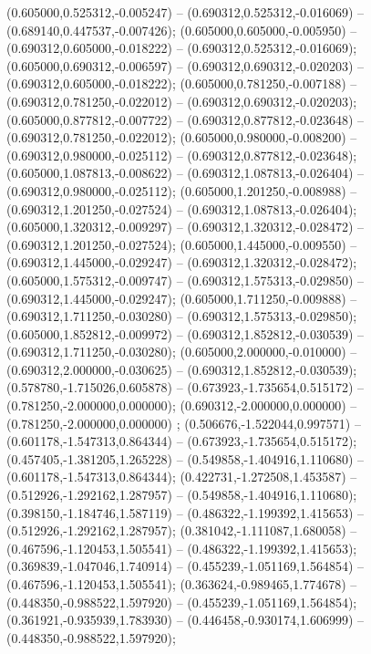  (0.605000,0.525312,-0.005247) -- (0.690312,0.525312,-0.016069) -- (0.689140,0.447537,-0.007426);
 (0.605000,0.605000,-0.005950) -- (0.690312,0.605000,-0.018222) -- (0.690312,0.525312,-0.016069);
 (0.605000,0.690312,-0.006597) -- (0.690312,0.690312,-0.020203) -- (0.690312,0.605000,-0.018222);
 (0.605000,0.781250,-0.007188) -- (0.690312,0.781250,-0.022012) -- (0.690312,0.690312,-0.020203);
 (0.605000,0.877812,-0.007722) -- (0.690312,0.877812,-0.023648) -- (0.690312,0.781250,-0.022012);
 (0.605000,0.980000,-0.008200) -- (0.690312,0.980000,-0.025112) -- (0.690312,0.877812,-0.023648);
 (0.605000,1.087813,-0.008622) -- (0.690312,1.087813,-0.026404) -- (0.690312,0.980000,-0.025112);
 (0.605000,1.201250,-0.008988) -- (0.690312,1.201250,-0.027524) -- (0.690312,1.087813,-0.026404);
 (0.605000,1.320312,-0.009297) -- (0.690312,1.320312,-0.028472) -- (0.690312,1.201250,-0.027524);
 (0.605000,1.445000,-0.009550) -- (0.690312,1.445000,-0.029247) -- (0.690312,1.320312,-0.028472);
 (0.605000,1.575312,-0.009747) -- (0.690312,1.575313,-0.029850) -- (0.690312,1.445000,-0.029247);
 (0.605000,1.711250,-0.009888) -- (0.690312,1.711250,-0.030280) -- (0.690312,1.575313,-0.029850);
 (0.605000,1.852812,-0.009972) -- (0.690312,1.852812,-0.030539) -- (0.690312,1.711250,-0.030280);
 (0.605000,2.000000,-0.010000) -- (0.690312,2.000000,-0.030625) -- (0.690312,1.852812,-0.030539);
 (0.578780,-1.715026,0.605878) -- (0.673923,-1.735654,0.515172) -- (0.781250,-2.000000,0.000000);
 (0.690312,-2.000000,0.000000) -- (0.781250,-2.000000,0.000000) ;
 (0.506676,-1.522044,0.997571) -- (0.601178,-1.547313,0.864344) -- (0.673923,-1.735654,0.515172);
 (0.457405,-1.381205,1.265228) -- (0.549858,-1.404916,1.110680) -- (0.601178,-1.547313,0.864344);
 (0.422731,-1.272508,1.453587) -- (0.512926,-1.292162,1.287957) -- (0.549858,-1.404916,1.110680);
 (0.398150,-1.184746,1.587119) -- (0.486322,-1.199392,1.415653) -- (0.512926,-1.292162,1.287957);
 (0.381042,-1.111087,1.680058) -- (0.467596,-1.120453,1.505541) -- (0.486322,-1.199392,1.415653);
 (0.369839,-1.047046,1.740914) -- (0.455239,-1.051169,1.564854) -- (0.467596,-1.120453,1.505541);
 (0.363624,-0.989465,1.774678) -- (0.448350,-0.988522,1.597920) -- (0.455239,-1.051169,1.564854);
 (0.361921,-0.935939,1.783930) -- (0.446458,-0.930174,1.606999) -- (0.448350,-0.988522,1.597920);
